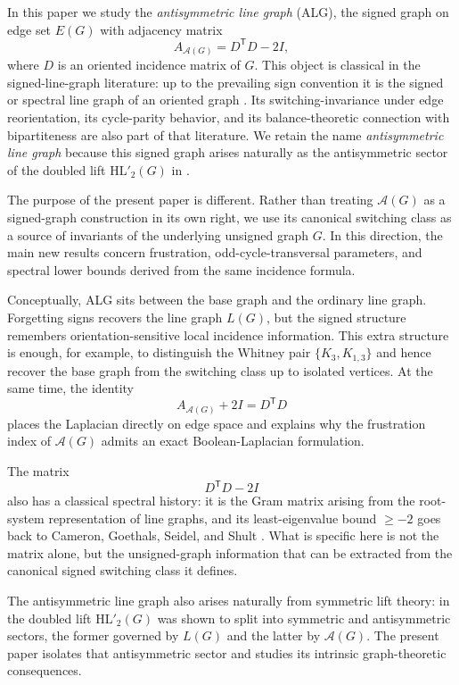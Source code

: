 \documentclass[11pt]{article}
\theoremstyle{plain}
\begin{document}
In this paper we study the \emph{antisymmetric line graph} (ALG), the signed graph
on edge set $E(G)$ with adjacency matrix
\[
A_{\mathcal A(G)}=D^{\mathsf T}D-2I,
\]
where $D$ is an oriented incidence matrix of $G$. This object is classical in
the signed-line-graph literature: up to the prevailing sign convention it is the
signed or spectral line graph of an oriented graph
\cite{GerminaHameedZaslavsky2011,Zaslavsky2010Matrices,BelardoPisanskiStanicZaslavsky2023}.
Its switching-invariance under edge reorientation, its cycle-parity behavior,
and its balance-theoretic connection with bipartiteness are also part of that
literature. We retain the name \emph{antisymmetric line graph} because this
signed graph arises naturally as the antisymmetric sector of the doubled lift
$\mathrm{HL}'_2(G)$ in \cite{BalHL}.

The purpose of the present paper is different. Rather than treating
$\mathcal A(G)$ as a signed-graph construction in its own right, we use its
canonical switching class as a source of invariants of the underlying unsigned
graph $G$. In this direction, the main new results concern frustration,
odd-cycle-transversal parameters, and spectral lower bounds derived from the same
incidence formula.

Conceptually, ALG sits between the base graph and the ordinary line graph.
Forgetting signs recovers the line graph $L(G)$, but the signed structure
remembers orientation-sensitive local incidence information. This extra
structure is enough, for example, to distinguish the Whitney pair
$\{K_3,K_{1,3}\}$ and hence recover the base graph from the switching class up to
isolated vertices. At the same time, the identity
\[
A_{\mathcal A(G)}+2I=D^{\mathsf T}D
\]
places the Laplacian directly on edge space and explains why the frustration
index of $\mathcal A(G)$ admits an exact Boolean-Laplacian formulation.

The matrix
\[
D^{\mathsf T}D-2I
\]
also has a classical spectral history: it is the Gram matrix arising from the
root-system representation of line graphs, and its least-eigenvalue bound
$\ge -2$ goes back to Cameron, Goethals, Seidel, and Shult \cite{CGSS}. What is
specific here is not the matrix alone, but the unsigned-graph information that
can be extracted from the canonical signed switching class it defines.

The antisymmetric line graph also arises naturally from symmetric lift theory:
in \cite{BalHL} the doubled lift $\mathrm{HL}'_2(G)$ was shown to split into
symmetric and antisymmetric sectors, the former governed by $L(G)$ and the latter
by $\mathcal A(G)$. The present paper isolates that antisymmetric sector and
studies its intrinsic graph-theoretic consequences.
\end{document}
